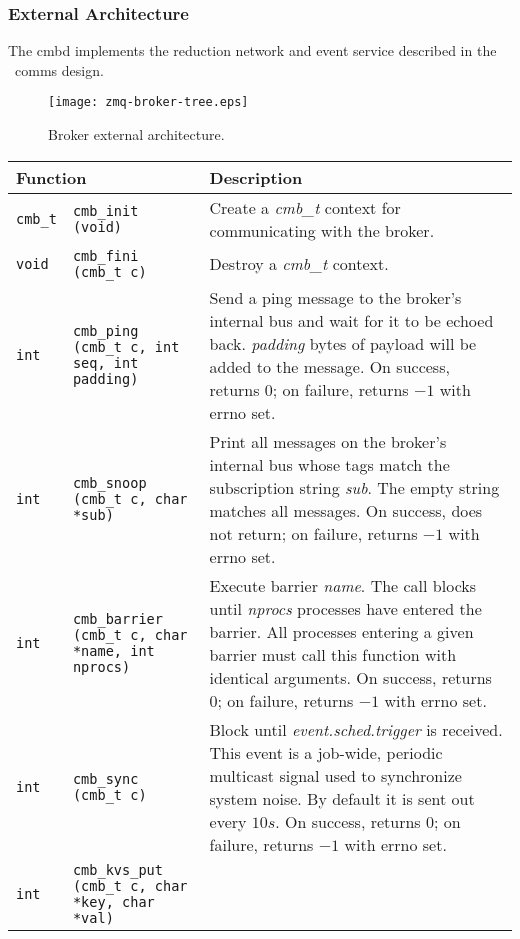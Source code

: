 \subsubsection {External Architecture}
The cmbd implements the reduction network and event service described
in the \ngrm\ comms design.

\begin{figure}
\centering
\texttt{[image: zmq-broker-tree.eps]}
\caption{Broker external architecture.}
\label{fig:cmbext}
\end{figure}


\begin{table}
\centering
\begin{tabular}{|p{0.7cm}p{5cm}|p{9cm}|}\hline
\multicolumn{2}{|l|}{\textbf{Function}}
  & \textbf{Description} \\
\hline
{\tt cmb\_t} & {\tt cmb\_init (void)}
  & Create a {\em cmb\_t} context for communicating with the broker.\\
{\tt void} & {\tt cmb\_fini (cmb\_t c)}
  & Destroy a {\em cmb\_t} context.\\
\hline
{\tt int} & {\tt cmb\_ping (cmb\_t c, int seq, int padding)}
  & Send a ping message to the broker's internal bus and wait for it
    to be echoed back.  {\em padding} bytes of payload will be added to
    the message.
    On success, returns $0$; on failure, returns $-1$ with errno set.\\
\hline
{\tt int} & {\tt cmb\_snoop (cmb\_t c, char {*sub})}
  & Print all messages on the broker's internal bus whose tags match the
    subscription string {\em sub}.  The empty string matches all messages.
    On success, does not return; on failure, returns $-1$ with errno set.\\
\hline
{\tt int}
  & {\tt cmb\_barrier (cmb\_t c, char {*name}, int nprocs)}
  & Execute barrier {\em name}.  The call blocks until {\em nprocs}
    processes have entered the barrier.  
    All processes entering a given barrier must call this function with
    identical arguments.
    On success, returns $0$; on failure, returns $-1$ with errno set.\\
\hline
{\tt int}
  & {\tt cmb\_sync (cmb\_t c)}
  & Block until {\em event.sched.trigger} is received.  This event is
    a job-wide, periodic multicast signal used to synchronize system noise.
    By default it is sent out every $10s$.
    On success, returns $0$; on failure, returns $-1$ with errno set.\\
\hline
{\tt int}
  & {\tt cmb\_kvs\_put (cmb\_t c, char {*key}, char {*val})}

\end{tabular}
\end{table}
